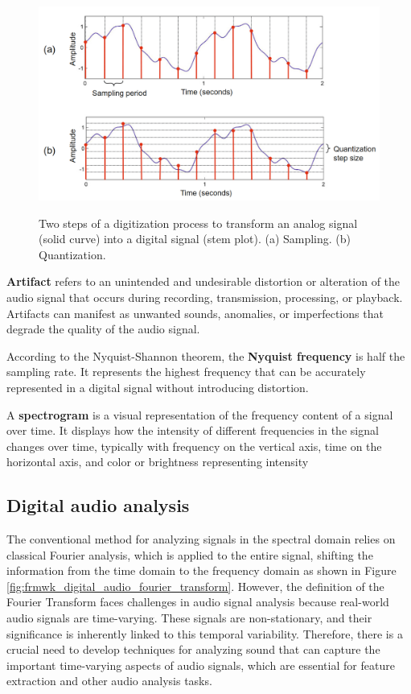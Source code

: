 \begin{figure}[htbp]
    \raggedright
        \caption{Two steps of a digitization process to transform an analog signal (solid curve) into a digital signal (stem plot). (a) Sampling. (b) Quantization.}
        \includegraphics[width=1.0\textwidth]{resources/images/030-theoretical_framework/Framework_audio_fund_digitization_process.png}
        \label{fig:frmwk_audio_fund_digitization_process}
\end{figure}

\textbf{Artifact} refers to an unintended and undesirable distortion or alteration of the audio signal that occurs during recording, transmission, processing, or playback. Artifacts can manifest as unwanted sounds, anomalies, or imperfections that degrade the quality of the audio signal.

According to the Nyquist-Shannon theorem, the \textbf{Nyquist frequency} is half the sampling rate. It represents the highest frequency that can be accurately represented in a digital signal without introducing distortion.

A \textbf{spectrogram} is a visual representation of the frequency content of a signal over time. It displays how the intensity of different frequencies in the signal changes over time, typically with frequency on the vertical axis, time on the horizontal axis, and color or brightness representing intensity


\subsection{Digital audio analysis}
\label{subsec:audio_fundamentals_digital_audio_analsys}

The conventional method for analyzing signals in the spectral domain relies on classical Fourier analysis, which is applied to the entire signal, shifting the information from the time domain to the frequency domain as shown in Figure \ref{fig:frmwk_digital_audio_fourier_transform}. However, the definition of the Fourier Transform faces challenges in audio signal analysis because real-world audio signals are time-varying. These signals are non-stationary, and their significance is inherently linked to this temporal variability. Therefore, there is a crucial need to develop techniques for analyzing sound that can capture the important time-varying aspects of audio signals, which are essential for feature extraction and other audio analysis tasks.

